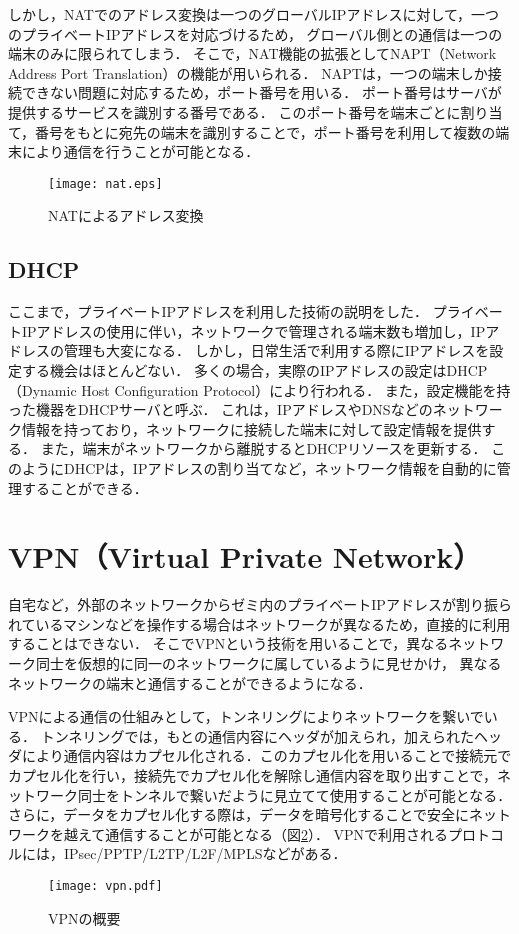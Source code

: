 しかし，NATでのアドレス変換は一つのグローバルIPアドレスに対して，一つのプライベートIPアドレスを対応づけるため，
グローバル側との通信は一つの端末のみに限られてしまう．
そこで，NAT機能の拡張としてNAPT（Network Address Port Translation）の機能が用いられる．
NAPTは，一つの端末しか接続できない問題に対応するため，ポート番号を用いる．
ポート番号はサーバが提供するサービスを識別する番号である．
このポート番号を端末ごとに割り当て，番号をもとに宛先の端末を識別することで，ポート番号を利用して複数の端末により通信を行うことが可能となる．
\begin{figure}[htbp]
 \begin{center}
  \texttt{[image: nat.eps]}
 \end{center}
 \caption{NATによるアドレス変換}
 \label{nat}
\end{figure}

\subsection{DHCP}
ここまで，プライベートIPアドレスを利用した技術の説明をした．
プライベートIPアドレスの使用に伴い，ネットワークで管理される端末数も増加し，IPアドレスの管理も大変になる．
しかし，日常生活で利用する際にIPアドレスを設定する機会はほとんどない．
多くの場合，実際のIPアドレスの設定はDHCP（Dynamic Host Configuration Protocol）により行われる．
また，設定機能を持った機器をDHCPサーバと呼ぶ．
これは，IPアドレスやDNSなどのネットワーク情報を持っており，ネットワークに接続した端末に対して設定情報を提供する．
また，端末がネットワークから離脱するとDHCPリソースを更新する．
このようにDHCPは，IPアドレスの割り当てなど，ネットワーク情報を自動的に管理することができる．

\section{VPN（Virtual Private Network）}
自宅など，外部のネットワークからゼミ内のプライベートIPアドレスが割り振られているマシンなどを操作する場合はネットワークが異なるため，直接的に利用することはできない．
そこでVPNという技術を用いることで，異なるネットワーク同士を仮想的に同一のネットワークに属しているように見せかけ，
異なるネットワークの端末と通信することができるようになる．\par
VPNによる通信の仕組みとして，トンネリングによりネットワークを繋いでいる．
トンネリングでは，もとの通信内容にヘッダが加えられ，加えられたヘッダにより通信内容はカプセル化される．このカプセル化を用いることで接続元でカプセル化を行い，接続先でカプセル化を解除し通信内容を取り出すことで，ネットワーク同士をトンネルで繋いだように見立てて使用することが可能となる．
さらに，データをカプセル化する際は，データを暗号化することで安全にネットワークを越えて通信することが可能となる（図\ref{vpn}）．
VPNで利用されるプロトコルには，IPsec/PPTP/L2TP/L2F/MPLSなどがある．
\begin{figure}[htbp]
 \begin{center}
  \texttt{[image: vpn.pdf]}
 \end{center}
 \caption{VPNの概要}
 \label{vpn}
\end{figure}

